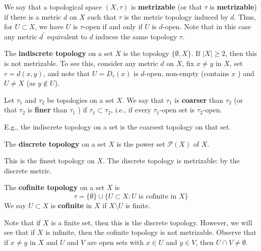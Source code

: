 \documentclass[a4paper]{article}
\begin{document}
\begin{definition}
We say that a topological space $(X, \tau)$ is \textbf{metrizable} (or that $\tau$ is \textbf{metrizable}) if there is a metric $d$ on $X$ such that $\tau$ is the metric topology induced by $d$.
Thus, for $U \subset X$, we have $U$ is $\tau$-open if and only if $U$ is $d$-open. Note that in this case any metric $d^{\prime}$ equivalent to $d$ induces the same topology $\tau$.
\end{definition}

\begin{example}
    The \textbf{indiscrete topology} on a set $X$ is the topology $\{\emptyset, X\}$.
    If $|X| \geqslant 2$, then this is not metrizable. To see this, consider any metric $d$ on $X$, fix $x \neq y$ in $X$, set $r=d(x, y)$, and note that $U=D_r(x)$ is $d$-open, non-empty (contains $x$ ) and $U \neq X$ (as $y \notin U$).
\end{example}

\begin{definition}
    Let $\tau_1$ and $\tau_2$ be topologies on a set $X$. We say that $\tau_1$ is \textbf{coarser} than $\tau_2$ (or that $\tau_2$ is \textbf{finer} than $\tau_1$ ) if $\tau_1 \subset \tau_2$, i.e., if every $\tau_1$-open set is $\tau_2$-open.
\end{definition}
E.g., the indiscrete topology on a set is the coarsest topology on that set.

\begin{example}
    The \textbf{discrete topology} on a set $X$ is the power set $\mathcal{P}(X)$ of $X$.

    This is the finest topology on $X$. The discrete topology is metrizable: by the discrete metric.
\end{example}

\begin{example}
    The \textbf{cofinite topology} on a set $X$ is
    \[
    \tau=\{\emptyset\} \cup\{U \subset X: U \text { is cofinite in } X\}
    \]
    We say $U \subset X$ is \textbf{cofinite} in $X$ if $X \setminus U$ is finite.
    
    Note that if $X$ is a finite set, then this is the discrete topology.
    However, we will see that if $X$ is infinite, then the cofinite topology is not metrizable. Observe that if $x \neq y$ in $X$ and $U$ and $V$ are open sets with $x \in U$ and $y \in V$, then $U \cap V \neq \emptyset$.
\end{example}
\end{document}
